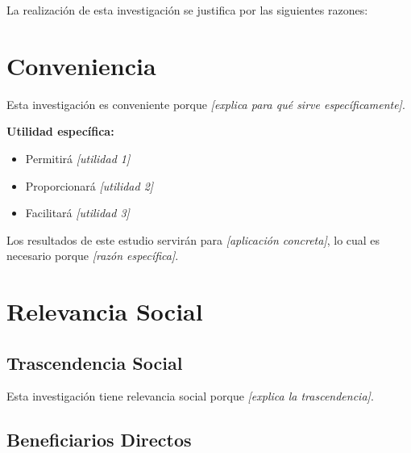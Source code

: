 La realización de esta investigación se justifica por las siguientes razones:

\section{Conveniencia}
\label{sec:conveniencia}


Esta investigación es conveniente porque \textit{[explica para qué sirve específicamente]}.

\textbf{Utilidad específica:}

\begin{itemize}
    \item Permitirá \textit{[utilidad 1]}
    \item Proporcionará \textit{[utilidad 2]}
    \item Facilitará \textit{[utilidad 3]}
\end{itemize}

Los resultados de este estudio servirán para \textit{[aplicación concreta]}, lo cual es necesario porque \textit{[razón específica]}.

\section{Relevancia Social}
\label{sec:relevancia_social}


\subsection{Trascendencia Social}

Esta investigación tiene relevancia social porque \textit{[explica la trascendencia]}.

\subsection{Beneficiarios Directos}

